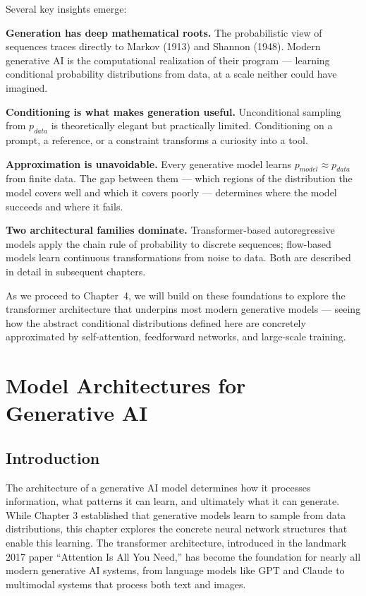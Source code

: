 \documentclass{book}
\begin{document}
Several key insights emerge:

\textbf{Generation has deep mathematical roots.} The probabilistic view of
sequences traces directly to Markov (1913) and Shannon (1948). Modern generative
AI is the computational realization of their program --- learning conditional
probability distributions from data, at a scale neither could have imagined.

\textbf{Conditioning is what makes generation useful.} Unconditional sampling
from $p_{data}$ is theoretically elegant but practically limited. Conditioning
on a prompt, a reference, or a constraint transforms a curiosity into a tool.

\textbf{Approximation is unavoidable.} Every generative model learns
$p_{model} \approx p_{data}$ from finite data. The gap between them --- which
regions of the distribution the model covers well and which it covers poorly ---
determines where the model succeeds and where it fails.

\textbf{Two architectural families dominate.} Transformer-based autoregressive
models apply the chain rule of probability to discrete sequences; flow-based
models learn continuous transformations from noise to data. Both are described
in detail in subsequent chapters.

As we proceed to Chapter~4, we will build on these foundations to explore the
transformer architecture that underpins most modern generative models ---
seeing how the abstract conditional distributions defined here are concretely
approximated by self-attention, feedforward networks, and large-scale training.


\chapter{Model Architectures for Generative AI}

\section{Introduction}

The architecture of a generative AI model determines how it processes information, what patterns it can learn, and ultimately what it can generate. While Chapter 3 established that generative models learn to sample from data distributions, this chapter explores the concrete neural network structures that enable this learning. The transformer architecture, introduced in the landmark 2017 paper ``Attention Is All You Need,'' has become the foundation for nearly all modern generative AI systems, from language models like GPT and Claude to multimodal systems that process both text and images.
\end{document}
